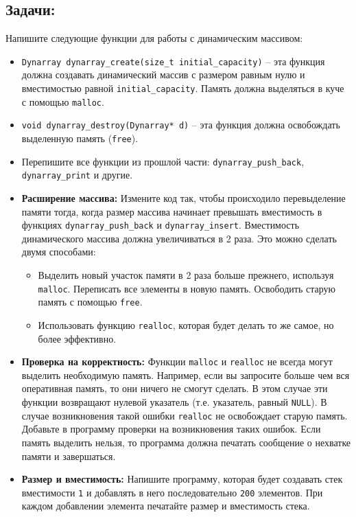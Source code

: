 \documentclass{article}
\begin{document}
\subsection*{Задачи:} 
Напишите следующие функции для работы с динамическим массивом:
\begin{itemize}
\item \texttt{Dynarray dynarray\_create(size\_t initial\_capacity)} -- эта функция должна создавать динамический массив с размером равным нулю и вместимостью равной \texttt{initial\_capacity}. Память должна выделяться в куче с помощью \texttt{malloc}.

\item \texttt{void dynarray\_destroy(Dynarray* d)} -- эта функция должна освобождать выделенную память (\texttt{free}).

\item Перепишите все функции из прошлой части: \texttt{dynarray\_push\_back}, \texttt{dynarray\_print} и другие.

\item \textbf{Расширение массива:} Измените код так, чтобы происходило перевыделение памяти тогда, когда размер массива начинает превышать вместимость в функциях \texttt{dynarray\_push\_back} и \texttt{dynarray\_insert}. Вместимость динамического массива должна увеличиваться в 2 раза.  Это можно сделать двумя способами:
\begin{itemize}
\item Выделить новый участок памяти в 2 раза больше прежнего, используя \texttt{malloc}. Переписать все элементы в новую память. Освободить старую память с помощью \texttt{free}.
\item Использовать функцию \texttt{realloc}, которая будет делать то же самое, но более эффективно.
\end{itemize}

\item \textbf{Проверка на корректность:} Функции \texttt{malloc} и \texttt{realloc} не всегда могут выделить необходимую память. Например, если вы запросите больше чем вся оперативная память, то они ничего не смогут сделать. В этом случае эти функции возвращают нулевой указатель (т.е. указатель, равный \texttt{NULL}). В случае возникновения такой ошибки \texttt{realloc} не освобождает старую память. Добавьте в программу проверки на возникновения таких ошибок. Если память выделить нельзя, то программа должна печатать сообщение о нехватке памяти и завершаться.

\item \textbf{Размер и вместимость:}
Напишите программу, которая будет создавать стек вместимости \texttt{1} и добавлять в него последовательно \texttt{200} элементов. При каждом добавлении элемента печатайте размер и вместимость стека.\\


\end{itemize}
\end{document}
